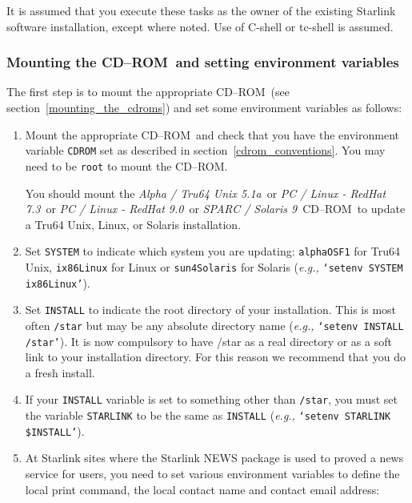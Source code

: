 \documentclass[twoside,11pt]{article}
\newcommand{\htmlref}[2]{#1}
\newcommand{\latex}[1]{#1}
\renewcommand{\_}{\texttt{\symbol{95}}}
\newcommand{\cdrom}{CD--ROM}
\newcommand{\cdrom}{CD-ROM}
\newcommand{\axp}{\textit{Alpha / Tru64 Unix 5.1a}}
\newcommand{\rha}{\textit{PC / Linux - RedHat 7.3}}
\newcommand{\rhb}{\textit{PC / Linux - RedHat 9.0}}
\newcommand{\sol}{\textit{SPARC / Solaris 9}}
\begin{document}
It is assumed that you execute these tasks as the owner of the
existing Starlink software installation, except where noted.
Use of C-shell or tc-shell is assumed.

\subsubsection{Mounting the \cdrom\ and setting environment variables}

The first step is to \htmlref{mount}{mounting_the_cdrom} the appropriate
\cdrom\ \latex{(see section~\ref{mounting_the_cdroms})}
and set some environment variables as follows:   

\begin{enumerate}

\item Mount the appropriate \cdrom\ and check that you have the
environment variable \texttt{CDROM} set as described in
section~\ref{cdrom_conventions}.  You may need to be \texttt{root} to
mount the \cdrom.

You should mount the \axp\ or \rha\ or \rhb\ or \sol\ \cdrom\ to update a Tru64
Unix, Linux, or Solaris installation.

\item Set \texttt{SYSTEM} to indicate which system you are updating:
\texttt{alpha\_OSF1} for Tru64 Unix, \texttt{ix86\_Linux} for Linux
or \texttt{sun4\_Solaris} for Solaris (\emph{e.g.,} \texttt{`setenv SYSTEM
ix86\_Linux'}).

\item Set \texttt{INSTALL} to indicate the root directory of your
installation.  This is most often \texttt{/star} but may be any absolute 
directory name (\emph{e.g.,} \texttt{`setenv INSTALL /star'}). It
is now compulsory to have /star as a real directory or as a soft
link to your installation directory. For this reason we recommend
that you do a fresh install.

\item If your \texttt{INSTALL} variable is set to something other than
\texttt{/star}, you must set the variable \texttt{STARLINK} to be the
same as \texttt{INSTALL} (\emph{e.g.,} \texttt{`setenv STARLINK \$INSTALL'}).

\item At Starlink sites where the Starlink NEWS package is used to
proved a news service for users, you need to set various environment
variables to define the local print command, the local contact name and
contact email address:


\end{enumerate}
\end{document}
